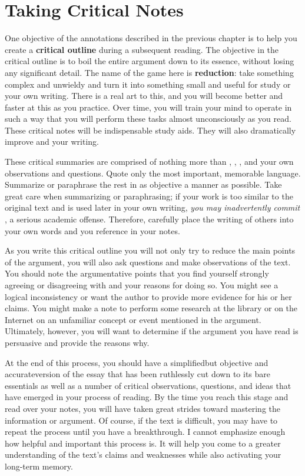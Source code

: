 \section{Taking Critical Notes}

One objective of the annotations described in the previous chapter is to help you create a \textbf{critical outline} during a subsequent reading. The objective in the critical
outline is to boil the entire argument down to its essence, without losing any
significant detail. The name of the game here is \textbf{reduction}: take
something complex and unwieldy and turn it into something small and useful for
study or your own writing. There is a real art to this, and you will become
better and faster at this as you practice. Over time, you will train your mind
to operate in such a way that you will perform these tasks almost unconsciously
as you read. These critical notes will be indispensable study aids. They will
also dramatically improve and your writing.

These critical summaries are comprised of nothing more than \hyperlink{summary}{\color{Ahrenge}{summary}}, \hyperlink{paraphrase}{\color{Ahrenge}{paraphrase}}, \hyperlink{quotation}{\color{Ahrenge}{quotation}}, and your own observations and
questions. Quote only the most important, memorable language. Summarize or
paraphrase the rest in as objective a manner as possible. Take great care when
summarizing or paraphrasing; if your work is too similar to the original text
and is used later in your own writing, \emph{you may inadvertently commit
\hyperlink{plagiarism}{\color{Ahrenge}{plagiarism}}}, a serious academic
offense. Therefore, carefully place the writing of others into your own words
and \hyperlink{citation}{\color{Ahrenge}{cite the page numbers}} you reference in your notes.

As you write this critical outline you will not only try to reduce the main
points of the argument, you will also ask questions and make observations of the
text. You should note the argumentative points that you find yourself strongly
agreeing or disagreeing with and your reasons for doing so. You might see a
logical inconsistency or want the author to provide more evidence for his or her
claims. You might make a note to perform some research at the library or on the
Internet on an unfamiliar concept or event mentioned in the argument.
Ultimately, however, you will want to determine if the argument you have read is
persuasive and provide the reasons why.

At the end of this process, you should have a simplified\textemdash but
objective and accurate\textemdash version of the essay that has been ruthlessly
cut down to its bare essentials as well as a number of critical observations,
questions, and ideas that have emerged in your process of reading. By the time
you reach this stage and read over your notes, you will have taken great strides
toward mastering the information or argument. Of course, if the text is difficult, you may have to repeat the process until you have a breakthrough. I cannot emphasize enough how helpful and important this process is. It will help you come to a greater understanding of the text’s claims and weaknesses while also activating your long-term memory. 

